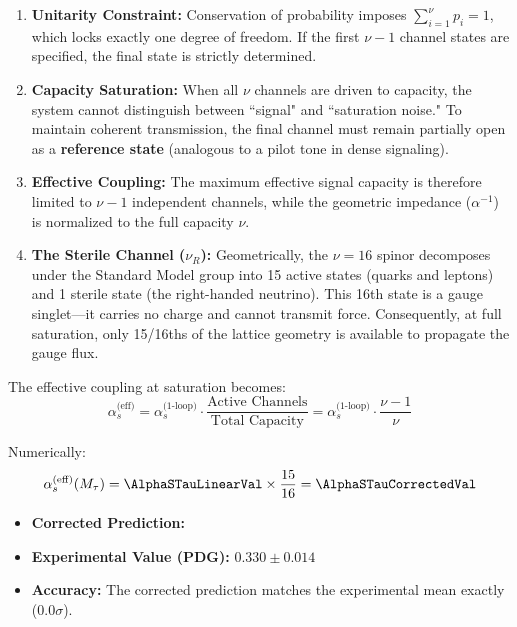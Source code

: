 \begin{enumerate}
    \item \textbf{Unitarity Constraint:} Conservation of probability imposes $\sum_{i=1}^{\nu} p_i = 1$, which locks exactly one degree of freedom. If the first $\nu-1$ channel states are specified, the final state is strictly determined.
    
    \item \textbf{Capacity Saturation:} When all $\nu$ channels are driven to capacity, the system cannot distinguish between ``signal" and ``saturation noise." To maintain coherent transmission, the final channel must remain partially open as a \textbf{reference state} (analogous to a pilot tone in dense signaling).
    
    \item \textbf{Effective Coupling:} The maximum effective signal capacity is therefore limited to $\nu-1$ independent channels, while the geometric impedance ($\alpha^{-1}$) is normalized to the full capacity $\nu$.

    \item \textbf{The Sterile Channel ($\nu_R$):} Geometrically, the $\nu=16$ spinor decomposes under the Standard Model group into 15 active states (quarks and leptons) and 1 sterile state (the right-handed neutrino). This 16th state is a gauge singlet—it carries no charge and cannot transmit force. Consequently, at full saturation, only 15/16ths of the lattice geometry is available to propagate the gauge flux.
\end{enumerate}

The effective coupling at saturation becomes:
\begin{equation}
\alpha_s^{\text{(eff)}} = \alpha_s^{\text{(1-loop)}} \cdot \frac{\text{Active Channels}}{\text{Total Capacity}} 
= \alpha_s^{\text{(1-loop)}} \cdot \frac{\nu-1}{\nu}
\end{equation}

Numerically:
\begin{equation}
\alpha_s^{\text{(eff)}}(M_\tau) = \AlphaSTauLinearVal \times \frac{15}{16} = \mathbf{\AlphaSTauCorrectedVal}
\end{equation}

\begin{itemize}
    \item \textbf{Corrected Prediction:} \AlphaSTauCorrectedVal
    \item \textbf{Experimental Value (PDG):} $0.330 \pm 0.014$
    \item \textbf{Accuracy:} The corrected prediction matches the experimental mean exactly ($0.0\sigma$).
\end{itemize}

